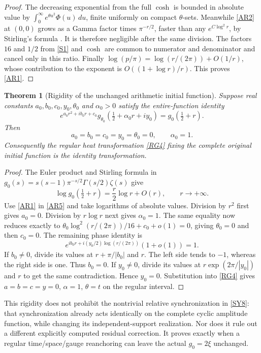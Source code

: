 \documentclass[11pt,a4paper]{article}
\newtheorem{theorem}{Theorem}[section]
\theoremstyle{definition}\newtheorem{definition}[theorem]{Definition}
\begin{document}
\begin{proof}
The decreasing exponential from the full $\cosh$ is bounded in absolute value by $\int_0^\infty e^{\theta u^2}\Phi(u)\,du$, finite uniformly on compact $\theta$-sets. Meanwhile \eqref{AR2} at $(0,0)$ grows as a Gamma factor times $\pi^{-r/2}$, faster than any $e^{C\log^2r}$, by Stirling's formula \cite{DLMF}. It is therefore negligible after the same division. The factors $16$ and $1/2$ from \eqref{S1} and $\cosh$ are common to numerator and denominator and cancel only in this ratio. Finally
$\log(p/\pi)=\log(r/(2\pi))+O(1/r)$, whose contribution to the exponent is $O((1+\log r)/r)$. This proves \eqref{AR1}.
\end{proof}

\begin{theorem}[Rigidity of the unchanged arithmetic initial function]
Suppose real constants $a_0,b_0,c_0,y_0,\theta_0$ and $\alpha_0>0$ satisfy the entire-function identity
\begin{equation}
 e^{a_0r^2+ib_0r+c_0}
 g_{\theta_0}(\tfrac12+\alpha_0r+iy_0)
       =g_0(\tfrac12+r).                                    \tag{AR5}\label{AR5}
\end{equation}
Then
\begin{equation}
 \boxed{a_0=b_0=c_0=y_0=\theta_0=0,\qquad \alpha_0=1.}       \tag{AR6}\label{AR6}
\end{equation}
Consequently the regular heat transformation \eqref{RG4} fixing the complete original initial function is the identity transformation.
\end{theorem}
\begin{proof}
The Euler product and Stirling formula in
$g_0(s)=s(s-1)\pi^{-s/2}\Gamma(s/2)\zeta(s)$ give
\[
 \log g_0(\tfrac12+r)=\frac r2\log r+O(r),\qquad r\to+\infty.
\]
Use \eqref{AR1} in \eqref{AR5} and take logarithms of absolute values. Division by $r^2$ first gives $a_0=0$. Division by $r\log r$ next gives $\alpha_0=1$. The same equality now reduces exactly to
$\theta_0\log^2(r/(2\pi))/16+c_0+o(1)=0$, giving $\theta_0=0$ and then $c_0=0$.
The remaining phase identity is
\[
 e^{i b_0r+i(y_0/2)\log(r/(2\pi))}(1+o(1))=1.
\]
If $b_0\ne0$, divide its values at $r+\pi/|b_0|$ and $r$. The left side tends to $-1$, whereas the right side is one. Thus $b_0=0$. If $y_0\ne0$, divide its values at $r\exp(2\pi/|y_0|)$ and $r$ to get the same contradiction. Hence $y_0=0$. Substitution into \eqref{RG4} gives $a=b=c=y=0$, $\alpha=1$, $\theta=t$ on the regular interval.
\end{proof}

This rigidity does not prohibit the nontrivial relative synchronization in \eqref{SY8}: that synchronization already acts identically on the complete cyclic amplitude function, while changing its independent-support realization. Nor does it rule out a different explicitly computed residual correction. It proves exactly when a regular time/space/gauge reanchoring can leave the actual $g_0=2\xi$ unchanged.
\end{document}
